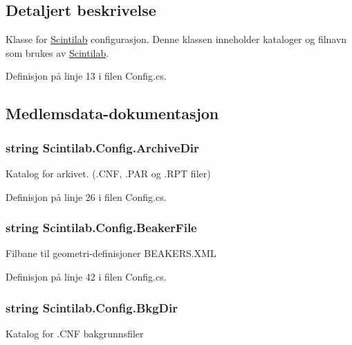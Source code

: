 \subsection{Detaljert beskrivelse}
Klasse for \hyperlink{namespace_scintilab}{Scintilab} configurasjon. Denne klassen inneholder kataloger og filnavn som brukes av \hyperlink{namespace_scintilab}{Scintilab}. 

Definisjon på linje 13 i filen Config.\+cs.



\subsection{Medlemsdata-\/dokumentasjon}
\hypertarget{class_scintilab_1_1_config_a772b5a6dcac628889128d1a896b36658}{
\subsubsection[{Archive\+Dir}]{\setlength{\rightskip}{0pt plus 5cm}string Scintilab.\+Config.\+Archive\+Dir\hspace{0.3cm}{\ttfamily [static]}}}\label{class_scintilab_1_1_config_a772b5a6dcac628889128d1a896b36658}
Katalog for arkivet. (.C\+N\+F, .P\+A\+R og .R\+P\+T filer) 

Definisjon på linje 26 i filen Config.\+cs.

\hypertarget{class_scintilab_1_1_config_a1a1585ef6037b90a42a2fd1b2bac9b9d}{
\subsubsection[{Beaker\+File}]{\setlength{\rightskip}{0pt plus 5cm}string Scintilab.\+Config.\+Beaker\+File\hspace{0.3cm}{\ttfamily [static]}}}\label{class_scintilab_1_1_config_a1a1585ef6037b90a42a2fd1b2bac9b9d}
Filbane til geometri-\/definisjoner B\+E\+A\+K\+E\+R\+S.\+X\+M\+L 

Definisjon på linje 42 i filen Config.\+cs.

\hypertarget{class_scintilab_1_1_config_afdad0bcf0906fdd0e7f34b3400fa8809}{
\subsubsection[{Bkg\+Dir}]{\setlength{\rightskip}{0pt plus 5cm}string Scintilab.\+Config.\+Bkg\+Dir\hspace{0.3cm}{\ttfamily [static]}}}\label{class_scintilab_1_1_config_afdad0bcf0906fdd0e7f34b3400fa8809}
Katalog for .C\+N\+F bakgrunnsfiler 

